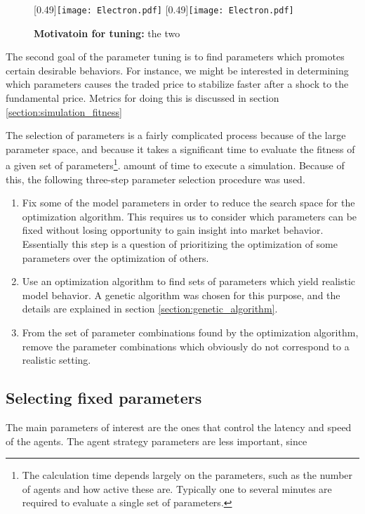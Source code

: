 \begin{figure}
	[0.49\linewidth]{\texttt{[image: Electron.pdf]}}
	[0.49\linewidth]{\texttt{[image: Electron.pdf]}}
	\caption{\textbf{Motivatoin for tuning:} the two}\label{fig:tuning_motivation}
\end{figure}

The second goal of the parameter tuning is to find parameters which promotes certain desirable behaviors. For instance, we might be interested in determining which parameters causes the traded price to stabilize faster after a shock to the fundamental price. Metrics for doing this is discussed in section \ref{section:simulation_fitness}

The selection of parameters is a fairly complicated process because of the large parameter space, and because it takes a significant time to evaluate the fitness of a given set of parameters\footnote{The calculation time depends largely on the parameters, such as the number of agents and how active these are. Typically one to several minutes are required to evaluate a single set of parameters.}. amount of time to execute a simulation. Because of this, the following three-step parameter selection procedure was used.
\begin{enumerate}
	\item Fix some of the model parameters in order to reduce the search space for the optimization algorithm. This requires us to consider which parameters can be fixed without losing opportunity to gain insight into market behavior. Essentially this step is a question of prioritizing the optimization of some parameters over the optimization of others. 
	\item Use an optimization algorithm to find sets of parameters which yield realistic model behavior. A genetic algorithm was chosen for this purpose, and the details are explained in section \ref{section:genetic_algorithm}.
	\item From the set of parameter combinations found by the optimization algorithm, remove the parameter combinations which obviously do not correspond to a realistic setting.
\end{enumerate}

\subsection{Selecting fixed parameters}
The main parameters of interest are the ones that control the latency and speed of the agents. The agent strategy parameters are less important, since 



